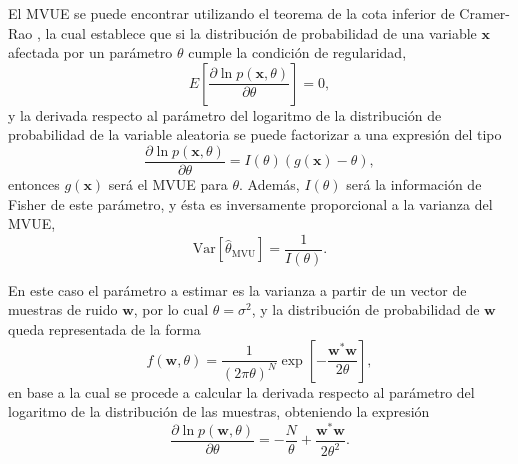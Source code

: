 El MVUE se puede encontrar utilizando el teorema de la cota inferior de Cramer-Rao \cite{kay}, la cual establece que si la distribución de probabilidad de una variable $\mathbf{x}$ afectada por un parámetro $\theta$ cumple la condición de regularidad,
\begin{equation}
    E\left[\frac{\partial \ln p(\mathbf{x},\theta)}{\partial \theta}\right] = 0,
\end{equation}
y la derivada respecto al parámetro del logaritmo de la distribución de probabilidad de la variable aleatoria se puede factorizar a una expresión del tipo
\begin{equation}\label{eq:cramer-rao}
    \frac{\partial \ln p(\mathbf{x},\theta)}{\partial \theta} = I(\theta)\left(g(\mathbf{x})-\theta\right),
\end{equation}
entonces $g(\mathbf{x})$ será el MVUE para $\theta$. Además, $I(\theta)$ será la información de Fisher de este parámetro, y ésta es inversamente proporcional a la varianza del MVUE,
\begin{equation}\label{eq:var-mvue}
    \text{Var}[\widehat{\theta}_{\text{MVU}}] = \frac{1}{I(\theta)}.
\end{equation}

En este caso el parámetro a estimar es la varianza a partir de un vector de muestras de ruido $\mathbf{w}$, por lo cual $\theta = \sigma^2$, y la distribución de probabilidad de $\mathbf{w}$ queda representada de la forma 
\begin{equation}\label{eq:noise-estimation-distribution}
    f(\mathbf{w}, \theta) = \frac{1}{\left(2\pi\theta\right)^N} \exp\left[- \frac{\mathbf{w}^\ast \mathbf{w}}{2\theta}\right],
\end{equation}
en base a la cual se procede a calcular la derivada respecto al parámetro del logaritmo de la distribución de las muestras, obteniendo la expresión
\begin{equation}\label{eq:logaritmo-derivada}
\frac{\partial \ln p(\mathbf{w},\theta)}{\partial \theta} =  - \frac{N}{ \theta} +\frac{\mathbf{w}^\ast\mathbf{w}}{2\theta^2}.
\end{equation}

